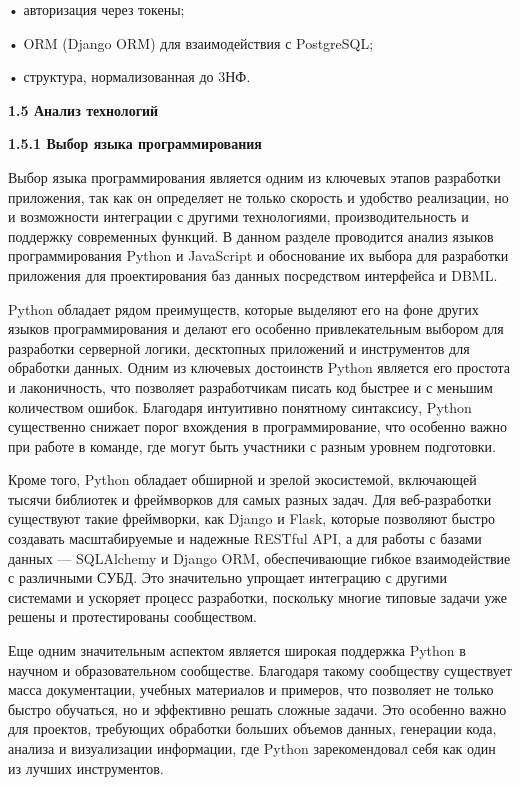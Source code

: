 	•	авторизация через токены;
    
	•	ORM (Django ORM) для взаимодействия с PostgreSQL;
    
	•	структура, нормализованная до 3НФ.


\textbf{\large 1.5 Анализ технологий}

\textbf{\large 1.5.1 Выбор языка программирования}

Выбор языка программирования является одним из ключевых этапов
разработки приложения, так как он определяет не только скорость и удобство
реализации, но и возможности интеграции с другими технологиями, производительность и поддержку современных функций. В данном разделе проводится анализ языков программирования Python и JavaScript и обоснование их выбора для разработки приложения для проектирования баз данных посредством интерфейса и DBML.

Python обладает рядом преимуществ, которые выделяют его на фоне других языков программирования и делают его особенно привлекательным выбором для разработки серверной логики, десктопных приложений и инструментов для обработки данных. Одним из ключевых достоинств Python является его простота и лаконичность, что позволяет разработчикам писать код быстрее и с меньшим количеством ошибок. Благодаря интуитивно понятному синтаксису, Python существенно снижает порог вхождения в программирование, что особенно важно при работе в команде, где могут быть участники с разным уровнем подготовки.

Кроме того, Python обладает обширной и зрелой экосистемой, включающей тысячи библиотек и фреймворков для самых разных задач. Для веб-разработки существуют такие фреймворки, как Django и Flask, которые позволяют быстро создавать масштабируемые и надежные RESTful API, а для работы с базами данных — SQLAlchemy и Django ORM, обеспечивающие гибкое взаимодействие с различными СУБД. Это значительно упрощает интеграцию с другими системами и ускоряет процесс разработки, поскольку многие типовые задачи уже решены и протестированы сообществом.

Еще одним значительным аспектом является широкая поддержка Python в научном и образовательном сообществе. Благодаря такому сообществу существует масса документации, учебных материалов и примеров, что позволяет не только быстро обучаться, но и эффективно решать сложные задачи. Это особенно важно для проектов, требующих обработки больших объемов данных, генерации кода, анализа и визуализации информации, где Python зарекомендовал себя как один из лучших инструментов.

